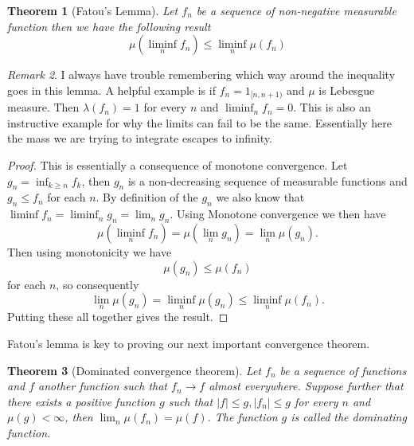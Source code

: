\documentclass[11pt]{article}
\newtheorem{thm}{Theorem}[section]
\theoremstyle{definition}
\theoremstyle{remark}
\newtheorem{remark}[thm]{Remark}
\begin{document}
\begin{thm}[Fatou's Lemma]
Let $f_n$ be a sequence of non-negative measurable function then we have the following result
\[ \mu \left( \liminf_n f_n \right) \leq \liminf_n \mu(f_n) \]
\end{thm}
\begin{remark}
I always have trouble remembering which way around the inequality goes in this lemma. A helpful example is if $f_n = 1_{[n,n+1)}$ and $\mu$ is Lebesgue measure. Then $\lambda(f_n) = 1$ for every $n$ and $\liminf_n f_n = 0$. This is also an instructive example for why the limits can fail to be the same. Essentially here the mass we are trying to integrate escapes to infinity.
\end{remark}
\begin{proof}
This is essentially a consequence of monotone convergence. Let $g_n = \inf_{k \geq n} f_k$, then $g_n$ is a non-decreasing sequence of measurable functions and $g_n \leq f_n$ for each $n$. By definition of the $g_n$ we also know that $\liminf f_n = \liminf_n g_n = \lim_n g_n$. Using Monotone convergence we then have
\[ \mu(\liminf_n f_n) = \mu(\lim_n g_n) = \lim_n \mu(g_n). \] Then using monotonicity we have
\[ \mu(g_n) \leq \mu(f_n) \] for each $n$, so consequently
\[\lim_n \mu(g_n) =  \liminf_n \mu(g_n) \leq \liminf_n \mu(f_n). \] Putting these all together gives the result. 
\end{proof}
Fatou's lemma is key to proving our next important convergence theorem.
\begin{thm}[Dominated convergence theorem]
Let $f_n$ be a sequence of functions and $f$ another function such that $f_n \rightarrow f$ almost everywhere. Suppose further that there exists a positive function $g$ such that $|f| \leq g, |f_n| \leq g$ for every $n$ and $\mu(g) < \infty$, then $\lim_n \mu(f_n) = \mu(f)$. The function $g$ is called the \emph{dominating function}.
\end{thm}
\end{document}
